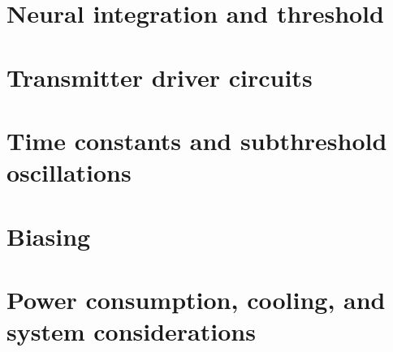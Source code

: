 \documentclass[twocolumn]{article}
\begin{document}
\section{\label{sec:neurons}Neural integration and threshold}

\section{\label{sec:transmitters}Transmitter driver circuits}

\section{\label{sec:time_constants}Time constants and subthreshold oscillations}

\section{\label{sec:biasing}Biasing}

\section{\label{sec:systems}Power consumption, cooling, and system considerations}


\end{document}
